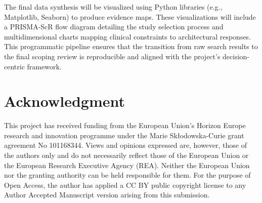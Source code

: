\documentclass[review,12pt]{elsarticle}
\begin{document}
The final data synthesis will be visualized using Python libraries (e.g., Matplotlib, Seaborn) to produce evidence maps.  These visualizations will include a PRISMA-ScR flow diagram detailing the study selection process and multidimensional charts mapping clinical constraints to architectural responses. This programmatic pipeline ensures that the transition from raw search results to the final scoping review is reproducible and aligned with the project's decision-centric framework.



\section*{Acknowledgment}

This project has received funding from the European Union’s Horizon Europe research and innovation programme under the Marie Skłodowska-Curie grant agreement No 101168344. Views and opinions expressed are, however, those of the authors only and do not necessarily reflect those of the European Union or the European Research Executive Agency (REA). Neither the European Union nor the granting authority can be held responsible for them. For the purpose of Open Access, the author has applied a CC BY public copyright license to any Author Accepted Manuscript version arising from this submission.



 

\end{document}
